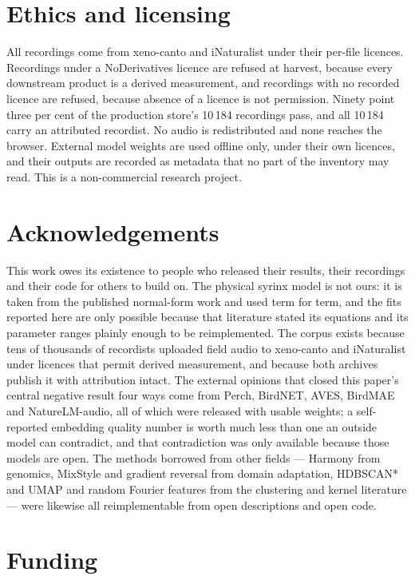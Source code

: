 \documentclass[10pt,twocolumn,a4paper]{article}
\begin{document}
\section*{Ethics and licensing}

All recordings come from xeno-canto and iNaturalist under their per-file licences. Recordings
under a NoDerivatives licence are refused at harvest, because every downstream product is a
derived measurement, and recordings with no recorded licence are refused, because absence of a
licence is not permission. Ninety point three per cent of the production store's 10\,184
recordings pass, and all 10\,184 carry an attributed recordist. No audio is redistributed and
none reaches the browser. External model weights are used offline only, under their own
licences, and their outputs are recorded as metadata that no part of the inventory may read.
This is a non-commercial research project.

\section*{Acknowledgements}

This work owes its existence to people who released their results, their recordings and their
code for others to build on. The physical syrinx model is not ours: it is taken from the
published normal-form work and used term for term, and the fits reported here are only
possible because that literature stated its equations and its parameter ranges plainly enough
to be reimplemented. The corpus exists because tens of thousands of recordists uploaded field
audio to xeno-canto and iNaturalist under licences that permit derived measurement, and
because both archives publish it with attribution intact. The external opinions that closed
this paper's central negative result four ways come from Perch, BirdNET, AVES, BirdMAE and
NatureLM-audio, all of which were released with usable weights; a self-reported embedding
quality number is worth much less than one an outside model can contradict, and that
contradiction was only available because those models are open. The methods borrowed from
other fields --- Harmony from genomics, MixStyle and gradient reversal from domain
adaptation, HDBSCAN* and UMAP and random Fourier features from the clustering and kernel
literature --- were likewise all reimplementable from open descriptions and open code.

\section*{Funding}
\end{document}
